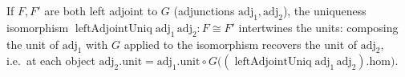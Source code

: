\begin{lemma}
  \label{mk-lem:unit_leftAdjointUniq_mathlib}
  \mathlibok

  If \(F, F'\) are both left adjoint to \(G\) (adjunctions \(\mathrm{adj}_1, \mathrm{adj}_2\)), the
  uniqueness isomorphism \(\operatorname{leftAdjointUniq}\mathrm{adj}_1\,\mathrm{adj}_2 : F \cong F'\)
  intertwines the units: composing the unit of \(\mathrm{adj}_1\) with \(G\) applied to the
  isomorphism recovers the unit of \(\mathrm{adj}_2\), i.e.\ at each object
  \(\mathrm{adj}_2.\mathrm{unit} = \mathrm{adj}_1.\mathrm{unit} \circ G\bigl(
  (\operatorname{leftAdjointUniq}\mathrm{adj}_1\,\mathrm{adj}_2).\mathrm{hom}\bigr)\).
\end{lemma}

